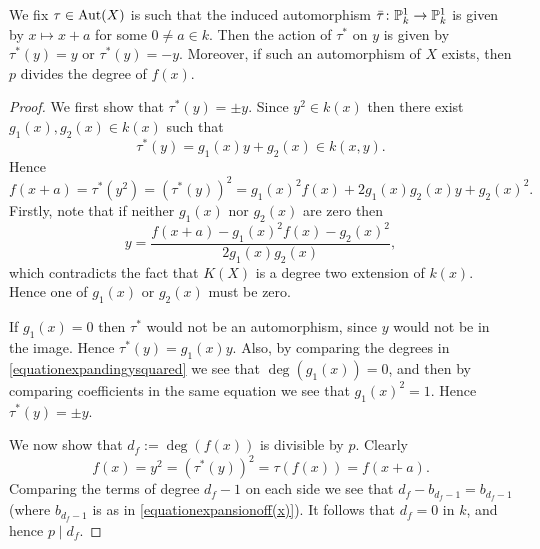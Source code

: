 \begin{lem}\label{lemmatauactsbyplusminusoneony}
    We fix $\tau \in \operatorname{Aut}(X)$ is such that the induced automorphism $\bar \tau \colon \mathbb P_k^1 \rightarrow \mathbb P_k^1$ is given by $x \mapsto x+ a$ for some $0 \neq a \in k$.
    Then the action of $\tau^*$ on $y$ is given by $\tau^*(y) = y$ or $\tau^*(y) = -y$.
    Moreover, if such an automorphism of $X$ exists, then $p$ divides the degree of $f(x)$.
    \end{lem}
    \begin{proof}
    We first show that $\tau^*(y) = \pm y$.
    Since $y^2 \in k(x)$ then there exist $g_1(x), g_2(x) \in k(x)$ such that 
        \begin{equation*}
        \tau^*(y) = g_1(x)y + g_2(x) \in k(x,y).
        \end{equation*}
    Hence
        \begin{equation}\label{equationexpandingysquared}
        f(x+a) = \tau^*(y^2) = (\tau^*(y))^2 = g_1(x)^2f(x)+2g_1(x)g_2(x)y + g_2(x)^2.
        \end{equation}
    Firstly, note that if neither $g_1(x)$ nor $g_2(x)$ are zero then
        \[
        y = \frac{f(x+a) - g_1(x)^2f(x) - g_2(x)^2}{2g_1(x)g_2(x)},
        \]
    which contradicts the fact that $K(X)$ is a degree two extension of $k(x)$.
    Hence one of $g_1(x)$ or $g_2(x)$ must be zero.
    
    If $g_1(x) = 0$ then $\tau^*$ would not be an automorphism, since $y$ would not be in the image.
    Hence $\tau^*(y) = g_1(x)y$.
    Also, by comparing the degrees in \eqref{equationexpandingysquared} we see that $\deg(g_1(x)) = 0$, and then by comparing coefficients in the same equation we see that $g_1(x)^2 = 1$.
    Hence $\tau^*(y) = \pm y$.

    We now show that $d_f := \deg(f(x))$ is divisible by $p$.
    Clearly 
        \[
        f(x) = y^2 = (\tau^*(y))^2 = \tau(f(x)) = f(x+a).  
        \]  
    Comparing the terms of degree $d_f-1$ on each side we see that $d_f - b_{d_f -1} = b_{d_f-1}$ (where $b_{d_f - 1}$ is as in \eqref{equationexpansionoff(x)}).
    It follows that $d_f = 0$ in $k$, and hence $p \mid d_f$.
    \end{proof}


